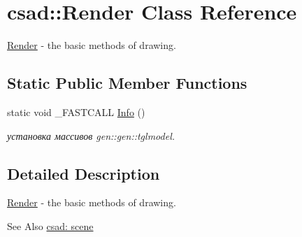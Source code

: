 \hypertarget{classcsad_1_1_render}{\section{csad\-:\-:Render Class Reference}
\label{classcsad_1_1_render}
}


\hyperlink{classcsad_1_1_render}{Render} -\/ the basic methods of drawing.  


\subsection*{Static Public Member Functions}
\begin{DoxyCompactItemize}
\item 
\hypertarget{classcsad_1_1_render_a3bf2c83bd00a588b77c5739e6cf6be94}{static void \-\_\-\-F\-A\-S\-T\-C\-A\-L\-L \hyperlink{classcsad_1_1_render_a3bf2c83bd00a588b77c5739e6cf6be94}{Info} ()}\label{classcsad_1_1_render_a3bf2c83bd00a588b77c5739e6cf6be94}

\begin{DoxyCompactList}\small\item\em установка массивов gen\-::gen\-::tglmodel. \end{DoxyCompactList}\end{DoxyCompactItemize}


\subsection{Detailed Description}
\hyperlink{classcsad_1_1_render}{Render} -\/ the basic methods of drawing. 

\begin{DoxySeeAlso}{See Also}
\hyperlink{group__scene}{csad\-: scene} 
\end{DoxySeeAlso}
